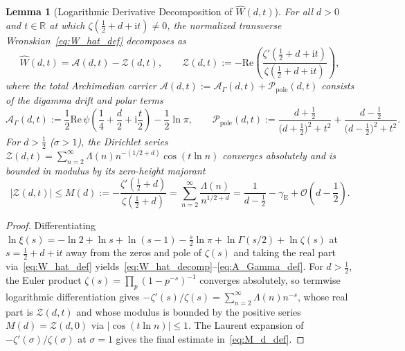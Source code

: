 \documentclass[11pt,reqno]{amsart}
\newtheorem{lemma}[theorem]{Lemma}
\theoremstyle{definition}
\theoremstyle{remark}
\numberwithin{equation}{section}
\newcommand{\R}{\mathbb{R}}
\newcommand{\ii}{\mathrm{i}}
\newcommand{\Rea}{\mathrm{Re}}
\begin{document}
\begin{lemma}[Logarithmic Derivative Decomposition of $\widehat{W}(d,t)$]\label{lem:log_deriv}
For all $d > 0$ and $t \in \R$ at which $\zeta(\frac{1}{2} + d + \ii t) \neq 0$, the normalized transverse Wronskian~\eqref{eq:W_hat_def} decomposes as
\begin{equation}\label{eq:W_hat_decomp}
\widehat{W}(d,t) = \mathcal{A}(d,t) - \mathcal{Z}(d,t), \qquad \mathcal{Z}(d,t) := -\Rea\!\left(\frac{\zeta'(\frac{1}{2} + d + \ii t)}{\zeta(\frac{1}{2} + d + \ii t)}\right),
\end{equation}
where the total Archimedian carrier $\mathcal{A}(d,t) := \mathcal{A}_\Gamma(d,t) + \mathcal{P}_{\mathrm{pole}}(d,t)$ consists of the digamma drift and polar terms
\begin{equation}\label{eq:A_Gamma_def}
\mathcal{A}_\Gamma(d,t) := \frac{1}{2}\Rea\,\psi\!\left(\frac{1}{4} + \frac{d}{2} + \ii\frac{t}{2}\right) - \frac{1}{2}\ln\pi, \qquad \mathcal{P}_{\mathrm{pole}}(d,t) := \frac{d + \frac{1}{2}}{\bigl(d + \frac{1}{2}\bigr)^2 + t^2} + \frac{d - \frac{1}{2}}{\bigl(d - \frac{1}{2}\bigr)^2 + t^2}.
\end{equation}
For $d > \frac{1}{2}$ ($\sigma > 1$), the Dirichlet series $\mathcal{Z}(d,t) = \sum_{n=2}^{\infty} \Lambda(n)\allowbreak n^{-(1/2+d)}\allowbreak\cos(t\ln n)$ converges absolutely and is bounded in modulus by its zero-height majorant
\begin{equation}\label{eq:M_d_def}
|\mathcal{Z}(d,t)| \le M(d) := -\frac{\zeta'(\frac{1}{2}+d)}{\zeta(\frac{1}{2}+d)} = \sum_{n=2}^{\infty} \frac{\Lambda(n)}{n^{1/2+d}} = \frac{1}{d - \frac{1}{2}} - \gamma_{\mathrm{E}} + \mathcal{O}\!\left(d - \frac{1}{2}\right).
\end{equation}
\end{lemma}

\begin{proof}
Differentiating $\ln\xi(s) = -\ln 2 + \ln s + \ln(s-1) - \frac{s}{2}\ln\pi + \ln\Gamma(s/2) + \ln\zeta(s)$ at $s = \frac{1}{2} + d + \ii t$ away from the zeros and pole of $\zeta(s)$ and taking the real part via~\eqref{eq:W_hat_def} yields~\eqref{eq:W_hat_decomp}--\eqref{eq:A_Gamma_def}. For $d > \frac{1}{2}$, the Euler product $\zeta(s) = \prod_p (1 - p^{-s})^{-1}$ converges absolutely, so termwise logarithmic differentiation gives $-\zeta'(s)/\zeta(s) = \sum_{n=2}^{\infty} \Lambda(n)n^{-s}$, whose real part is $\mathcal{Z}(d,t)$ and whose modulus is bounded by the positive series $M(d) = \mathcal{Z}(d,0)$ via $|\cos(t\ln n)| \le 1$. The Laurent expansion of $-\zeta'(\sigma)/\zeta(\sigma)$ at $\sigma = 1$ gives the final estimate in~\eqref{eq:M_d_def}.
\end{proof}
\end{document}
